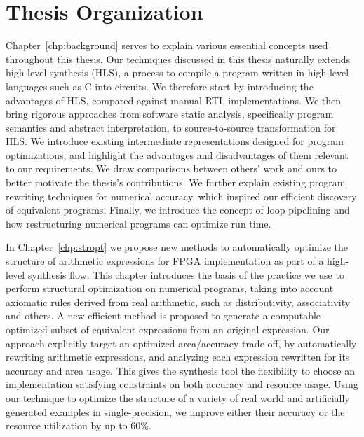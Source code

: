 \section{Thesis Organization}
\label{intro:sec:organization}

Chapter~\ref{chp:background} serves to explain various essential concepts
used throughout this thesis.  Our techniques discussed in this thesis
naturally extends high-level synthesis (HLS), a process to compile a program
written in high-level languages such as C into circuits.  We therefore
start by introducing the advantages of HLS, compared against manual RTL
implementations.  We then bring rigorous approaches from software static
analysis, specifically program semantics and abstract interpretation, to
source-to-source transformation for HLS\@.  We introduce existing intermediate
representations designed for program optimizations, and highlight the
advantages and disadvantages of them relevant to our requirements.  We draw
comparisons between others' work and ours to better motivate the thesis's
contributions.  We further explain existing program rewriting techniques for
numerical accuracy, which inspired our efficient discovery of equivalent
programs.  Finally, we introduce the concept of loop pipelining and how
restructuring numerical programs can optimize run time.

In Chapter~\ref{chp:stropt} we propose new methods to automatically optimize
the structure of arithmetic expressions for FPGA implementation as part of a
high-level synthesis flow.  This chapter introduces the basis of the practice
we use to perform structural optimization on numerical programs, taking into
account axiomatic rules derived from real arithmetic, such as distributivity,
associativity and others.  A new efficient method is proposed to generate
a computable optimized subset of equivalent expressions from an original
expression.  Our approach explicitly target an optimized area/accuracy
trade-off, by automatically rewriting arithmetic expressions, and analyzing
each expression rewritten for its accuracy and area usage.  This gives
the synthesis tool the flexibility to choose an implementation satisfying
constraints on both accuracy and resource usage.  Using our technique to
optimize the structure of a variety of real world and artificially generated
examples in single-precision, we improve either their accuracy or the resource
utilization by up to 60\%.


